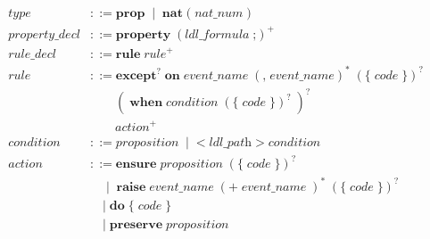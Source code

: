 \documentclass[preview=true]{standalone}
\newcommand{\token}[1]{\textbf{#1}}
\begin{document}
\begin{table}[t]
\begin{align*}
  \textit{type} &::=
    \token{prop}\;
    \mid\; \token{nat}\; \texttt{(}\; \textit{nat\_num}\; \texttt{)}
  \\
  \textit{property\_decl} &::=
  \token{property}\;
  \left(\textit{ldl\_formula}\; \texttt{;}\right)^+
  \\
  \textit{rule\_decl} &::= \token{rule}\;
  \textit{rule}^+
  \\
  \textit{rule} &::=
  \token{except}^?\; \token{on}\; \textit{event\_name}\;
  \left(\texttt{,}\; \textit{event\_name}\right)^\ast\;
  \left( \token{\{}\; \textit{code}\; \token{\}} \right)^?\;
  \\&\qquad
  \left(\;
  \token{when}\; \textit{condition}\;
  \left( \token{\{}\; \textit{code}\; \token{\}} \right)^?\;
  \right)^?
  \\&\qquad
  \textit{action}^+
  \\
  \textit{condition} &::= \textit{proposition}\;
  \mid\;
  \texttt{<}\; \textit{ldl\_path}\; \texttt{>}\; \textit{condition}
  \\
  \textit{action} &::=
  \token{ensure}\; \textit{proposition}\;
  \left( \token{\{}\; \textit{code}\; \token{\}} \right)^?\;
  \\&\quad
  \mid\;
  \token{raise}\; \textit{event\_name}\; \left(\texttt{+}\; \textit{event\_name}\; \right)^\ast\;
  \left( \token{\{}\; \textit{code}\; \token{\}} \right)^?\;
  \\&\quad
  \mid\;
  \token{do}\;
  \token{\{}\; \textit{code}\; \token{\}}\;
  \\&\quad
  \mid\;
  \token{preserve}\; \textit{proposition}
\end{align*}
\end{table}
\smallskip
\end{document}
